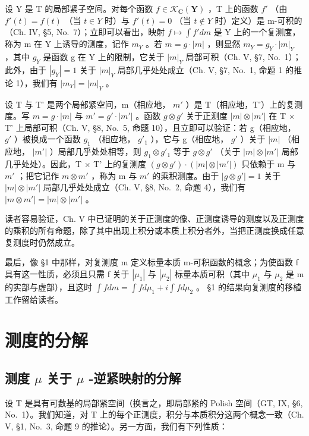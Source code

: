 设 Y 是 T 的局部紧子空间。对每个函数 \(f \in \mathcal{K}_{\mathbf{C}}(\mathbf{Y})\) ，T 上的函数 \(f'\) （由 \(f'(t) = f(t)\) （当 \(t \in Y\) 时）与 \(f'(t) = 0\) （当 \(t \notin Y\) 时）定义）是 m-可积的（Ch. IV, §5, No.~7）；立即可以看出，映射 \(f \mapsto \int f' dm\) 是 Y 上的一个复测度，称为 m 在 Y 上诱导的测度，记作 \(m_{Y}\) 。若 \(m = g \cdot |m|\) ，则显然 \(m_{Y} = g_{Y} \cdot |m|_{Y}\) ，其中 \(g_{Y}\) 是函数 g 在 Y 上的限制，它关于 \(|m|_{Y}\) 局部可积（Ch. V, §7, No.~1）；此外，由于 \(|g_{Y}| = 1\) 关于 \(|m|_{Y}\) 局部几乎处处成立（Ch. V, §7, No.~1, 命题 1 的推论 1），我们有 \(|m_{Y}| = |m|_{Y}\) 。

设 T 与 T' 是两个局部紧空间，m（相应地， \(m'\) ）是 T（相应地，T'）上的复测度。写 \(m = g \cdot |m|\) 与 \(m' = g' \cdot |m'|\) 。函数 \(g \otimes g'\) 关于正测度 \(|m| \otimes |m'|\) 在 T × T' 上局部可积（Ch. V, §8, No.~5, 命题 10），且立即可以验证：若 g（相应地， \(g'\) ）被换成一个函数 \(g_1\) （相应地， \(g'_1\) ），它与 g（相应地， \(g'\) ）关于 \(|m|\) （相应地， \(|m'|\) ）局部几乎处处相等，则 \(g_1 \otimes g'_1\) 等于 \(g \otimes g'\) （关于 \(|m| \otimes |m'|\) 局部几乎处处）。因此，T × T' 上的复测度 \((g \otimes g') \cdot (|m| \otimes |m'|)\) 只依赖于 m 与 \(m'\) ；把它记作 \(m \otimes m'\) ，称为 m 与 \(m'\) 的乘积测度。由于 \(|g \otimes g'| = 1\) 关于 \(|m| \otimes |m'|\) 局部几乎处处成立（Ch. V, §8, No.~2, 命题 4），我们有 \(|m \otimes m'| = |m| \otimes |m'|\) 。

读者容易验证，Ch. V 中已证明的关于正测度的像、正测度诱导的测度以及正测度的乘积的所有命题，除了其中出现上积分或本质上积分者外，当把正测度换成任意复测度时仍然成立。

最后，像 §1 中那样，对复测度 m 定义标量本质 m-可积函数的概念；为使函数 f 具有这一性质，必须且只需 f 关于 \(|\mu_{1}|\) 与 \(|\mu_{2}|\) 标量本质可积（其中 \(\mu_{1}\) 与 \(\mu_{2}\) 是 m 的实部与虚部），且这时 \(\int f dm = \int f d\mu_{1} + i \int f d\mu_{2}\) 。 §1 的结果向复测度的移植工作留给读者。

\section{测度的分解}

\subsection{\texorpdfstring{测度 \(\mu\) 关于 \(\mu\) -逆紧映射的分解}{测度 mu 关于 mu -逆紧映射的分解}}

设 T 是具有可数基的局部紧空间（换言之，即局部紧的 Polish 空间（GT, IX, §6, No.~1）。我们知道，对 T 上的每个正测度，积分与本质积分这两个概念一致（Ch. V, §1, No.~3, 命题 9 的推论）。另一方面，我们有下列性质：

